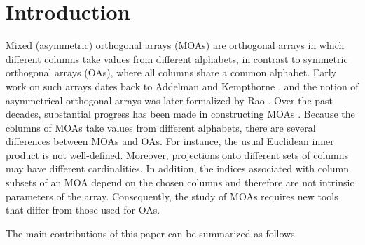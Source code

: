 \documentclass[11pt]{article}
\newtheorem{Definition and Notation}[Theorem]{Definition and Notation}
\begin{document}

\section{Introduction}
Mixed (asymmetric) orthogonal arrays (MOAs) are orthogonal arrays in which different columns take values from different alphabets, in contrast to symmetric orthogonal arrays (OAs), where all columns share a common alphabet. Early work on such arrays dates back to Addelman and Kempthorne \cite{Addelman_1962}, and the notion of asymmetrical orthogonal arrays was later formalized by Rao \cite{Rao1973}. Over the past decades, substantial progress has been made in constructing MOAs \cite{SuenDasDey2001,ZhangDengDey2017,ZhangZongDey2015,SuenDey2003,ZhangDuanYang2024,Suen2007,LinPang2025,LiZhuPang2025, NiuChenGaoPang2025, PangXuChenWang2018,PangEtAl2021}. Because the columns of MOAs take values from different alphabets, there are several differences between MOAs and OAs. For instance, the usual Euclidean inner product is not well-defined. Moreover, projections onto different sets of columns may have different cardinalities.  In addition, the indices associated with column subsets of an MOA depend on the chosen columns and therefore are not intrinsic parameters of the array. Consequently, the study of MOAs requires new tools that differ from those used for OAs.

The main contributions of this paper can be summarized as follows.
\end{document}
